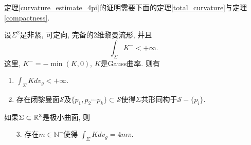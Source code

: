 定理\eqref{curvature_estimate_4pi}的证明需要下面的定理\eqref{total_curvature}与定理\eqref{compactness}.
\begin{theorem}\label{total_curvature}
    设$\Sigma^2$是非紧, 可定向, 完备的2维黎曼流形, 并且
    \begin{equation}
        \int_\Sigma K^- < +\infty. 
    \end{equation}
    这里, $K^-=-\min(K,0)$, $K$是Gauss曲率. 则有
    \begin{enumerate}
        \item $\int_\Sigma K dv_g < +\infty$.
        \item 存在闭黎曼面$\mathcal{S}$及$\{p_1,p_2\cdots p_k\} \subset \mathcal{S}$使得$\Sigma$共形同构于$\mathcal{S}-\{p_i\}$.
    \end{enumerate}
    如果$\Sigma \subset \mathbb{R}^3$是极小曲面, 则
    \begin{enumerate}
        \item[3.] 存在$m \in \mathbb{N}^-$使得 $\int_\Sigma K dv_g = 4m\pi$.
    \end{enumerate}
\end{theorem}
